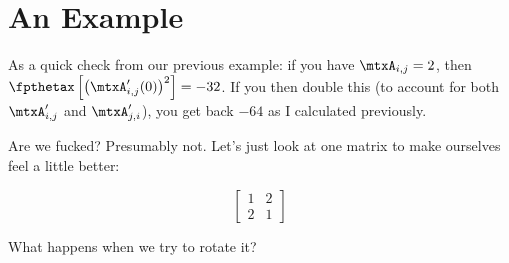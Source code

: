 \section{An Example}

As a quick check from our previous example: if you have $\mtxA_{i, j} =
2$, then $\fpthetax \left[ \left( \mtxA'_{i, j}(0) \right)^2 \right] =
-32$. If you then double this (to account for both $\mtxA'_{i, j}$ and
$\mtxA'_{j, i}$), you get back $-64$ as I calculated previously.

Are we fucked? Presumably not. Let's just look at one matrix to make
ourselves feel a little better:

\begin{equation*}
  \begin{bmatrix}
    1 & 2 \\
    2 & 1
  \end{bmatrix}
\end{equation*}

What happens when we try to rotate it?

